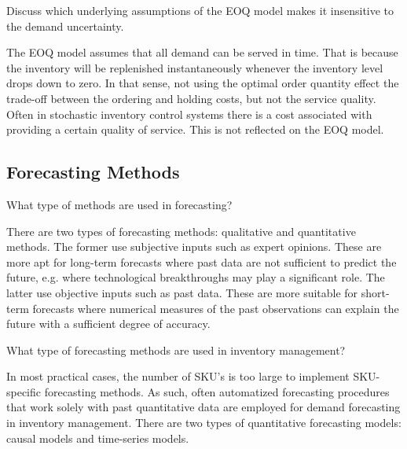 \begin{question}
Discuss which underlying assumptions of the EOQ model makes it insensitive to the demand uncertainty. 
\end{question}

  \begin{solution}
  The EOQ model assumes that all demand can be served in time. That is because the inventory will be replenished instantaneously whenever the inventory level drops down to zero. In that sense, not using the optimal order quantity effect the trade-off between the ordering and holding costs, but not the service quality. Often in stochastic inventory control systems there is a cost associated with providing a certain quality of service. This is not reflected on the EOQ model.
  \end{solution}

\subsection{Forecasting Methods}

\begin{question}
What type of methods are used in forecasting?
\end{question}

  \begin{solution}
    There are two types of forecasting methods: qualitative and quantitative methods. The former use subjective inputs such as expert opinions. These are more apt for long-term forecasts where past data are not sufficient to predict the future, e.g. where technological breakthroughs may play a significant role. The latter use objective inputs such as past data. These are more suitable for short-term forecasts where numerical measures of the past observations can explain the future with a sufficient degree of accuracy. 
   \end{solution}
   
\begin{question}
What type of forecasting methods are used in inventory management?

\end{question}

  \begin{solution}
	In most practical cases, the number of SKU's is too large to implement SKU-specific forecasting methods. As such, often automatized forecasting procedures that work solely with past quantitative data are employed for demand forecasting in inventory management. There are two types of quantitative forecasting models: causal models and time-series models.

   \end{solution}
   
